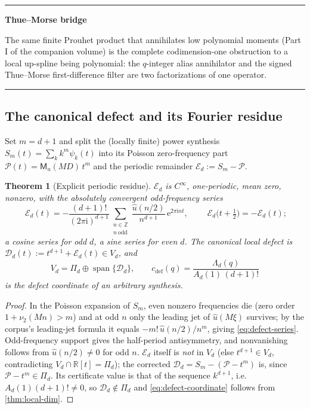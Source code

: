 \documentclass[11pt,oneside]{article}
\numberwithin{equation}{section}
\newtheorem{theorem}{Theorem}[section]
\theoremstyle{definition}
\theoremstyle{remark}
\newcommand{\R}{\mathbb R}
\newcommand{\Z}{\mathbb Z}
\newcommand{\e}{\mathrm e}
\newcommand{\ii}{\mathrm i}
\newcommand{\vtwo}{\nu_2}
\newcommand{\Span}{\operatorname{span}}
\newcommand{\MM}{\mathsf M}
\newcommand{\PiD}{\Pi_d}
\newenvironment{statusbox}[1]{%
  \par\smallskip\noindent\begin{center}\begin{minipage}{0.94\textwidth}%
  \hrule\vspace{0.5em}\noindent\textbf{#1}\par\smallskip
}{%
  \vspace{0.5em}\hrule\end{minipage}\end{center}\smallskip
}
\begin{document}
\begin{statusbox}{Thue--Morse bridge}
The same finite Prouhet product that annihilates low polynomial
moments (Part I of the companion volume) is the complete
codimension-one obstruction to a local up-spline being polynomial:
the $q$-integer alias annihilator and the signed Thue--Morse
first-difference filter are two factorizations of one operator.
\end{statusbox}

\subsection{The canonical defect and its Fourier residue}

Set $m=d+1$ and split the (locally finite) power synthesis
$S_m(t)=\sum_kk^{m}\psi_k(t)$ into its Poisson zero-frequency part
$\mathcal P(t)=\MM_u(MD)\,t^{m}$ and the periodic remainder
$\mathcal E_d:=S_m-\mathcal P$.

\begin{theorem}[Explicit periodic residue]
\label{thm:defect-Fourier}
$\mathcal E_d$ is $C^\infty$, one-periodic, mean zero, nonzero, with
the absolutely convergent odd-frequency series
\begin{equation}
 \boxed{\;
 \mathcal E_d(t)=
 -\frac{(d+1)!}{(2\pi\ii)^{d+1}}
 \sum_{\substack{n\in\Z\\ n\ \mathrm{odd}}}
 \frac{\widehat u(n/2)}{n^{d+1}}\,\e^{2\pi\ii nt},
 \;}
 \qquad
 \mathcal E_d\bigl(t+\tfrac12\bigr)=-\mathcal E_d(t);
 \label{eq:defect-series}
\end{equation}
a cosine series for odd $d$, a sine series for even $d$.  The
canonical local defect is
$\mathcal D_d(t):=t^{d+1}+\mathcal E_d(t)\in V_d$, and
\begin{equation}
 V_d=\PiD\oplus\Span\{\mathcal D_d\},
 \qquad
 c_{\mathrm{def}}(q)
 =\frac{\Lambda_d(q)}{A_d(1)\,(d+1)!}
 \label{eq:defect-coordinate}
\end{equation}
is the defect coordinate of an arbitrary synthesis.
\end{theorem}

\begin{proof}
In the Poisson expansion of $S_m$, even nonzero frequencies die
(zero order $1+\vtwo(Mn)>m$) and at odd $n$ only the leading jet of
$\widehat u(M\xi)$ survives; by the corpus's leading-jet formula it
equals $-m!\,\widehat u(n/2)/n^{m}$, giving
\eqref{eq:defect-series}.  Odd-frequency support gives the
half-period antisymmetry, and nonvanishing follows from
$\widehat u(n/2)\ne0$ for odd $n$.  $\mathcal E_d$ itself is
\emph{not} in $V_d$ (else $t^{d+1}\in V_d$, contradicting
$V_d\cap\R[t]=\PiD$); the corrected $\mathcal D_d=S_m-(\mathcal
P-t^{m})$ is, since $\mathcal P-t^{m}\in\PiD$.  Its certificate value
is that of the sequence $k^{d+1}$, i.e.\ $A_d(1)(d+1)!\ne0$, so
$\mathcal D_d\notin\PiD$ and \eqref{eq:defect-coordinate} follows
from \cref{thm:local-dim}.
\end{proof}
\end{document}
